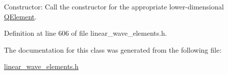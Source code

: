 Constructor\+: Call the constructor for the appropriate lower-\/dimensional \hyperlink{classoomph_1_1QElement}{Q\+Element}. 



Definition at line 606 of file linear\+\_\+wave\+\_\+elements.\+h.



The documentation for this class was generated from the following file\+:\begin{DoxyCompactItemize}
\item 
\hyperlink{linear__wave__elements_8h}{linear\+\_\+wave\+\_\+elements.\+h}\end{DoxyCompactItemize}
